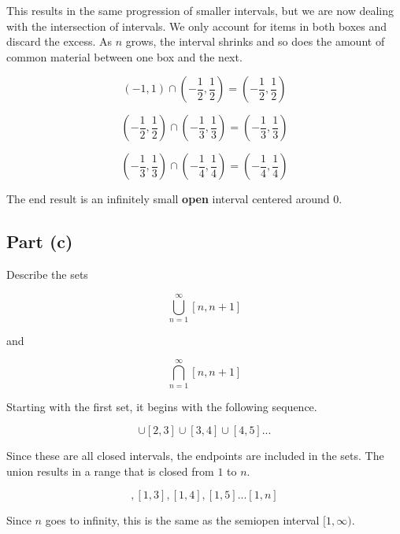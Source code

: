 \documentclass{article}
\begin{document}
This results in the same progression of smaller intervals, but we are now dealing with the intersection of intervals.
We only account for items in both boxes and discard the excess.
As $n$ grows, the interval shrinks and so does the amount of common material between one box and the next.

\begin{equation}
	(-1,1) \cap (-\frac{1}{2},\frac{1}{2}) = (-\frac{1}{2},\frac{1}{2})
\end{equation}

\begin{equation}
	(-\frac{1}{2},\frac{1}{2}) \cap (-\frac{1}{3},\frac{1}{3}) = (-\frac{1}{3},\frac{1}{3})
\end{equation}

\begin{equation}
	(-\frac{1}{3},\frac{1}{3}) \cap (-\frac{1}{4},\frac{1}{4}) = (-\frac{1}{4},\frac{1}{4})
\end{equation}

The end result is an infinitely small {\bf open} interval centered around $0$.

\subsection{Part (c)}

Describe the sets

\begin{equation}
	\bigcup_{n=1}^{\infty}[n,n+1]
\end{equation}

and

\begin{equation}
	\bigcap_{n=1}^{\infty}[n,n+1]
\end{equation}

Starting with the first set, it begins with the following sequence.

\begin{equation}
	[1,2]\cup[2,3]\cup[3,4]\cup[4,5]...
\end{equation}

Since these are all closed intervals, the endpoints are included in the sets.
The union results in a range that is closed from $1$ to $n$.

\begin{equation}
	[1,2], [1,3], [1,4], [1,5]...[1,n]
\end{equation}

Since $n$ goes to infinity, this is the same as the semiopen interval $[1,\infty)$.
\end{document}
